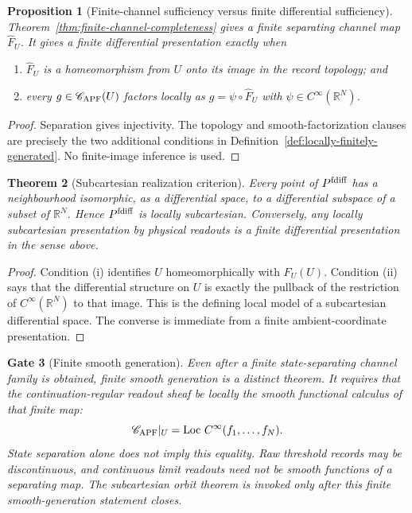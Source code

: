 \documentclass[11pt]{article}
\newtheorem{theorem}{Theorem}[section]
\newtheorem{proposition}[theorem]{Proposition}
\newtheorem{gate}[theorem]{Gate}
\theoremstyle{remark}
\begin{document}
\begin{proposition}[Finite-channel sufficiency versus finite differential sufficiency]
\label{prop:finite-sufficiency-split}
Theorem~\ref{thm:finite-channel-completeness} gives a finite separating channel
map $\widehat F_U$.  It gives a finite differential presentation exactly when
\begin{enumerate}[label=(\roman*)]
\item $\widehat F_U$ is a homeomorphism from $U$ onto its image in the record
topology; and
\item every $g\in\mathscr C_{\rm APF}(U)$ factors locally as
$g=\psi\circ\widehat F_U$ with $\psi\in C^\infty(\mathbb R^N)$.
\end{enumerate}
\end{proposition}

\begin{proof}
Separation gives injectivity.  The topology and smooth-factorization clauses
are precisely the two additional conditions in
Definition~\ref{def:locally-finitely-generated}.  No finite-image inference is
used.
\end{proof}

\begin{theorem}[Subcartesian realization criterion]
\label{cor:subcartesian-realization}
Every point of $P^{\rm fdiff}$ has a neighbourhood isomorphic, as a
differential space, to a differential subspace of a subset of
$\mathbb R^N$.  Hence $P^{\rm fdiff}$ is locally subcartesian.  Conversely,
any locally subcartesian presentation by physical readouts is a finite
differential presentation in the sense above.
\end{theorem}

\begin{proof}
Condition (i) identifies $U$ homeomorphically with $F_U(U)$.  Condition (ii)
says that the differential structure on $U$ is exactly the pullback of the
restriction of $C^\infty(\mathbb R^N)$ to that image.  This is the defining
local model of a subcartesian differential space.  The converse is immediate
from a finite ambient-coordinate presentation.
\end{proof}

\begin{gate}[Finite smooth generation]
\label{gate:finite-differential-sufficiency}
Even after a finite state-separating channel family is obtained, finite smooth
generation is a distinct theorem. It requires that the continuation-regular
readout sheaf be locally the smooth functional calculus of that finite map:
\[
\mathscr C_{\rm APF}|_U
=\operatorname{Loc}\,C^\infty(f_1,\ldots,f_N).
\]
State separation alone does not imply this equality. Raw threshold records may
be discontinuous, and continuous limit readouts need not be smooth functions of
a separating map. The subcartesian orbit theorem is invoked only after this
finite smooth-generation statement closes.
\end{gate}
\end{document}
